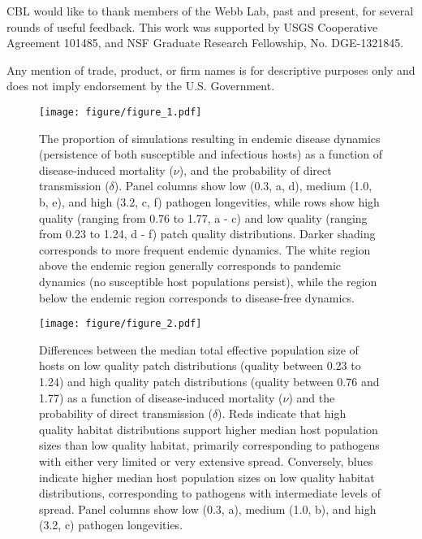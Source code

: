 \documentclass{article}
\begin{document}
CBL would like to thank members of the Webb Lab, past and present, for several rounds of useful feedback.  This work was supported by USGS Cooperative Agreement 101485, and NSF Graduate Research Fellowship, No. DGE-1321845.

Any mention of trade, product, or firm names is for descriptive purposes only and does not imply endorsement by the U.S. Government.

\clearpage

     

\clearpage

\begin{figure}
\texttt{[image: figure/figure\_1.pdf]}
\caption{The proportion of simulations resulting in endemic disease dynamics (persistence of both susceptible and infectious hosts) as a function of disease-induced mortality ($\nu$), and the probability of direct transmission ($\delta$).  Panel columns show low (0.3, a, d), medium (1.0, b, e), and high (3.2, c, f) pathogen longevities, while rows show high quality (ranging from 0.76 to 1.77, a - c) and low quality (ranging from 0.23 to 1.24, d - f) patch quality distributions.  Darker shading corresponds to more frequent endemic dynamics.  The white region above the endemic region generally corresponds to pandemic dynamics (no susceptible host populations persist), while the region below the endemic region corresponds to disease-free dynamics.}
\label{endemic}
\end{figure}

\begin{figure}
\texttt{[image: figure/figure\_2.pdf]}
\centering
\caption{Differences between the median total effective population size of hosts on low quality patch distributions (quality between 0.23 to 1.24) and high quality patch distributions (quality between 0.76 and 1.77) as a function of disease-induced mortality ($\nu$) and the probability of direct transmission ($\delta$).  Reds indicate that high quality habitat distributions support higher median host population sizes than low quality habitat, primarily corresponding to pathogens with either very limited or very extensive spread. Conversely, blues indicate higher median host population sizes on low quality habitat distributions, corresponding to pathogens with intermediate levels of spread.  Panel columns show low (0.3, a), medium (1.0, b), and high (3.2, c) pathogen longevities.}
\label{highvlow}
\end{figure}
\end{document}
